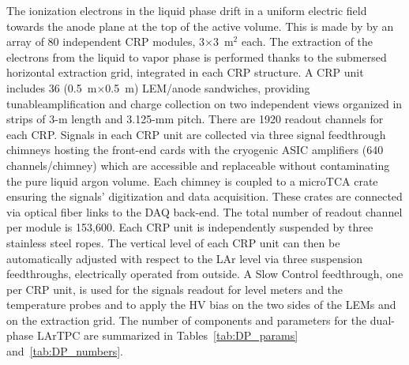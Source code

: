 The ionization electrons in the liquid phase drift  in a uniform electric field towards the anode plane at the top of the active
volume. This is made by by an array of 80 independent CRP modules, 3$\times$3~m$^2$ each.
The extraction of the electrons from the liquid to vapor phase is performed thanks to the submersed horizontal extraction grid, 
integrated in each CRP structure. A CRP unit includes 36 (0.5~m$\times$0.5~m) LEM/anode sandwiches, providing tunableamplification and charge collection on two independent views organized in strips of 3-m length and 3.125-mm pitch. There are 1920 readout channels for each CRP. Signals in each CRP unit are collected via three signal feedthrough chimneys hosting the front-end cards with the cryogenic ASIC amplifiers (640 channels/chimney) which are accessible and replaceable without contaminating the pure liquid argon volume. Each chimney is coupled to a microTCA crate ensuring the signals' digitization and 
data acquisition. These crates are connected  via optical fiber links to the DAQ back-end. The total number of readout channel 
per  module is 153,600.
 Each CRP unit is independently suspended by three stainless steel ropes. The vertical level of each CRP unit can then be automatically
adjusted with respect to the LAr level via three suspension feedthroughs, electrically operated from outside. A Slow Control feedthrough, 
one per CRP unit, is used for the signals readout for level meters and the temperature probes and to apply the HV bias on the two
sides of the LEMs and on the extraction grid. The number of components and parameters for the  dual-phase LArTPC are summarized in Tables~\ref{tab:DP_params}
and~\ref{tab:DP_numbers}.


